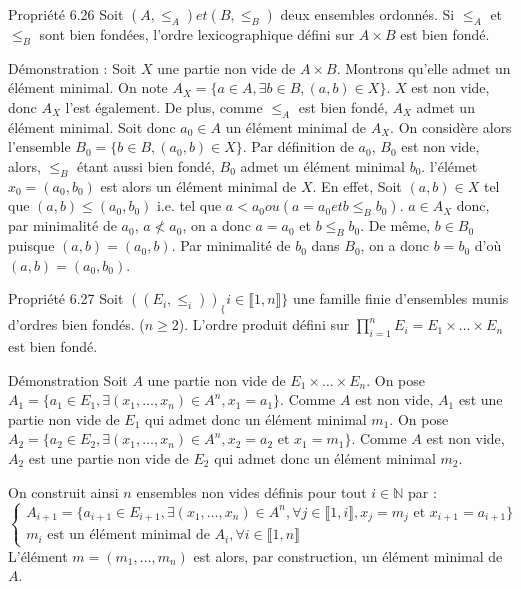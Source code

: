 \documentclass{article}
\begin{document}
\begin{adjustwidth}{-3cm}{-3cm}
    Propriété 6.26
    Soit $(A,\leq_A) et (B,\leq_B)$ deux ensembles ordonnés.
    Si $\leq_A$ et $\leq_B$ sont bien fondées, l'ordre lexicographique défini sur $A \times B$ est bien fondé.

    Démonstration : 
    Soit $X$ une partie non vide de $A \times B$. Montrons qu'elle admet un élément minimal.
    On note $A_X = \{a \in A, \exists b \in B, (a,b) \in X\}$. $X$ est non vide, donc $A_X$ l'est également.
    De plus, comme $\leq_A$ est bien fondé, $A_X$ admet un élément minimal.
    Soit donc $a_0 \in A$ un élément minimal de $A_X$. On considère alors l'ensemble $B_0 = \{b \in B, (a_0,b) \in X\}$.
    Par définition de $a_0$, $B_0$ est non vide, alors, $\leq_B$ étant aussi bien fondé, $B_0$ admet un élément minimal $b_0$. l'élémet $x_0 = (a_0, b_0)$ est alors un élément minimal de $X$.
    En effet, Soit $(a,b) \in X$ tel que $(a,b) \leq (a_0,b_0)$ i.e. tel que $a < a_0 ou (a = a_0 et b \leq_B b_0)$.
    $a \in A_X$ donc, par minimalité de $a_0$, $a \nless a_0$, on a donc $a = a_0$ et $b \leq_B b_0$.
    De même, $b \in B_0$ puisque $(a,b) = (a_0,b)$. Par minimalité de $b_0$ dans $B_0$, on a donc $b = b_0$ d'où $(a,b) = (a_0,b_0)$.

    Propriété 6.27
    Soit $((E_i,\leq_i))_\{i \in \llbracket 1,n \rrbracket \}$ une famille finie d'ensembles munis d'ordres bien fondés. ($n \geq 2$). L'ordre produit défini sur $\displaystyle \prod_{i=1}^{n}E_i = E_1 \times \ldots \times E_n$ est bien fondé.

    Démonstration Soit $A$ une partie non vide de $E_1 \times \ldots \times E_n$.
    On pose $A_1 = \{a_1 \in E_1, \exists (x_1,\ldots,x_n) \in A^n, x_1 = a_1\}$. Comme $A$ est non vide, $A_1$ est une partie non vide de $E_1$ qui admet donc un élément minimal $m_1$.
    On pose $A_2 = \{a_2 \in E_2, \exists (x_1,\ldots,x_n) \in A^n, x_2 = a_2 \text{ et } x_1 = m_1\}$. Comme $A$ est non vide, $A_2$ est une partie non vide de $E_2$ qui admet donc un élément minimal $m_2$. 

    On construit ainsi $n$ ensembles non vides définis pour tout $i \in \mathbb{N}$ par : 
    $$\begin{cases}
        A_{i+1} = \{a_{i+1} \in E_{i+1}, \exists (x_1, \ldots, x_n) \in A^n, \forall j \in \llbracket 1, i \rrbracket, x_j = m_j \text{ et } x_{i+1} = a_{i+1}\} \\
        m_i \text{ est un élément minimal de } A_i, \forall i \in \llbracket 1,n \rrbracket 
    \end{cases}$$
    L'élément $m = (m_1, \ldots, m_n)$ est alors, par construction, un élément minimal de $A$.


\end{adjustwidth}
\end{document}
